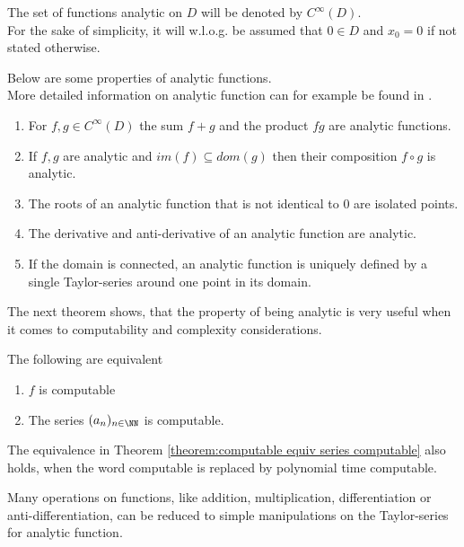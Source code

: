 		The set of functions analytic on $D$ will be denoted by $C^\infty(D)$. \\		
		For the sake of simplicity, it will w.l.o.g. be assumed that $0 \in D$ and $x_0 = 0$ if not stated otherwise.
		
		Below are some properties of analytic functions.\\
    More detailed information on analytic function can for example be found in \cite{krantz2002primer}. 

		\begin{enumerate}
			\item For $f,g \in C^\infty(D)$ the sum  $f+g$ and the product $fg$ are analytic functions.
			\item If $f, g$ are analytic and $im(f) \subseteq dom(g)$ then their composition $f \circ g$ is analytic.
			\item The roots of an analytic function that is not identical to $0$ are isolated points.
			\item The derivative and anti-derivative of an analytic function are analytic.
			\item If the domain is connected, an analytic function is uniquely defined by a single Taylor-series around one point in its domain.
		\end{enumerate}

    The next theorem shows, that the property of being analytic is very useful when it comes to computability and complexity considerations.

    \begin{theorem}\label{theorem:computable equiv series computable} 
			The following are equivalent
			\begin{enumerate}
				\item $f$ is computable 
				\item The series $(a_n)_{n \in \NN}$ is computable. 
 			\end{enumerate}
		\end{theorem}
    \begin{theorem}\label{theorem:computable equiv series computable polytime}
			The equivalence in Theorem \ref{theorem:computable equiv series computable} also holds, when the word computable is replaced by polynomial time computable.
		\end{theorem}
		
    Many operations on functions, like addition, multiplication, differentiation or anti-differentiation, can 
    be reduced to simple manipulations on the Taylor-series for analytic function.

